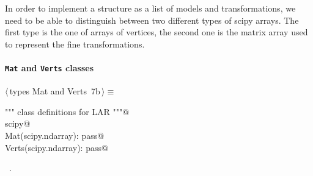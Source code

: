 \documentclass[11pt,oneside]{article}	%
\begin{document}
In order to implement a structure as a list of models and transformations, we need to be able to distinguish between two different types of scipy arrays. The first type is the one of arrays of vertices, the second one is the matrix array used to represent the fine transformations.

\paragraph{\texttt{Mat} and \texttt{Verts} classes}
\begin{flushleft} \small \label{scrap22}
\protect{}$\langle\,$types Mat and Verts\nobreak\ {\footnotesize 7b}$\,\rangle\equiv$
\vspace{-1ex}
\begin{list}{}{} \item
\mbox{}\verb@""" class definitions for LAR """@\\
\mbox{}\verb@import scipy@\\
\mbox{}\verb@class Mat(scipy.ndarray): pass@\\
\mbox{}\verb@class Verts(scipy.ndarray): pass@\\
\mbox{}\verb@@{\NWsep}
\end{list}
\vspace{-1ex}
\footnotesize\addtolength{\baselineskip}{-1ex}
\begin{list}{}{\setlength{\itemsep}{-\parsep}\setlength{\itemindent}{-\leftmargin}}
\item \NWtxtMacroRefIn\ .
\end{list}
\end{flushleft}
\end{document}
